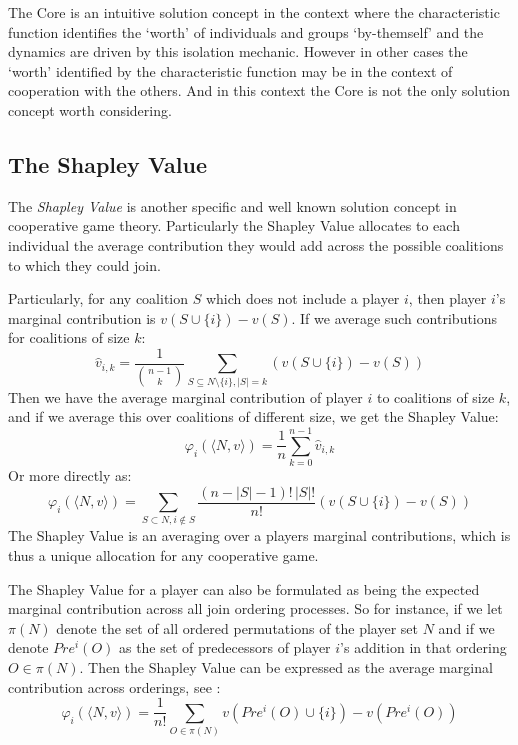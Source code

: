 The Core is an intuitive solution concept in the context where the characteristic function identifies the `worth' of individuals and groups `by-themself' and the dynamics are driven by this isolation mechanic.
However in other cases the `worth' identified by the characteristic function may be in the context of cooperation with the others.
And in this context the Core is not the only solution concept worth considering.

\subsection{The Shapley Value}\label{subsec:the_shapley_value}

The \textit{Shapley Value} is another specific and well known solution concept in cooperative game theory.
Particularly the Shapley Value allocates to each individual the average contribution they would add across the possible coalitions to which they could join.

Particularly, for any coalition $S$ which does not include a player $i$, then player $i$'s marginal contribution is $v(S\cup\{i\}) - v(S)$. If we average such contributions for coalitions of size $k$:
\begin{equation}\label{eq:shapley_value2}
\hat{v}_{i,k} = \frac{1}{\binom{n-1}{k}}\sum_{S\subseteq N\setminus \{ i\} , |S|=k} %
(v(S\cup\{i\})-v(S))
\end{equation}
Then we have the average marginal contribution of player $i$ to coalitions of size $k$, and if we average this over coalitions of different size, we get the Shapley Value:
\begin{equation}\label{shap2} \varphi_i(\langle N,v\rangle) = \frac{1}{n}\sum_{k=0}^{n-1}\hat{v}_{i,k} \end{equation}
Or more directly as:
\begin{equation}\label{shap1_X}\varphi_i(\langle N,v\rangle) = \sum_{S\subset N, i\notin S}\frac{(n-|S|-1)!\,|S|!}{n!}(v(S\cup\{i\})-v(S))\end{equation}
The Shapley Value is an averaging over a players marginal contributions, which is thus a unique allocation for any cooperative game.

The Shapley Value for a player can also be formulated as being the expected marginal contribution across all join ordering processes.
So for instance, if we let $\pi(N)$ denote the set of all ordered permutations of the player set $N$ and if we denote $Pre^i(O)$ as the set of predecessors of player $i$'s addition in that ordering $O\in \pi(N)$. Then the Shapley Value can be expressed as the average marginal contribution across orderings, see \cite{weber_1988}:
\begin{equation}\label{shapley_value3}
    \varphi_i(\langle N,v\rangle) = \frac{1}{n!}\sum_{O\in\pi(N)}v(Pre^i(O)\cup\{i\})-v(Pre^i(O))
\end{equation}

